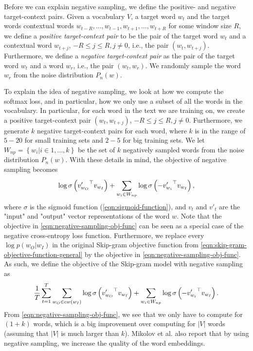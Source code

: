 Before we can explain negative sampling, we define the positive- and negative target-context pairs. Given a vocabulary $V$, a target word $w_t$ and the target words contextual words $w_{t-R}, \ldots, w_{t-1}, w_{t+1}, \ldots, w_{t+R}$ for some window size $R$, we define a \textit{positive target-context pair} to be the pair of the target word $w_t$ and a contextual word $w_{t+j}$, $-R \leq j \leq R, j \neq 0$, i.e., the pair $\left( w_t, w_{t+j} \right)$. Furthermore, we define a \textit{negative target-context pair} as the pair of the target word $w_t$ and a word $w_r$, i.e., the pair $\left( w_t, w_r \right)$. We randomly sample the word $w_r$ from the noise distribution $P_n(w)$.

To explain the idea of negative sampling, we look at how we compute the softmax loss, and in particular, how we only use a subset of all the words in the vocabulary. In particular, for each word in the text we are training on, we create a positive target-context pair $\left( w_t, w_{t+j} \right)$, $-R \leq j \leq R, j \neq 0$. Furthermore, we generate $k$ negative target-context pairs for each word, where $k$ is in the range of $5-20$ for small training sets and $2-5$ for big training sets. We let $W_{np} = \left \{ w_i | i \in 1, \ldots, k \right \}$ be the set of $k$ negatively sampled words from the noise distribution $P_n(w)$. With these details in mind, the objective of negative sampling becomes \cite{mikolov2013b, rong2016word2vec}
\begin{align}
    \log \sigma \left( {v'_{w_O}}^\top v_{w_I} \right) + \sum\limits_{w_i \in W_{np}}^{} \log \sigma \left( -{v'_{w_i}}^\top v_{w_I} \right),
    \label{eqn:negative-sampling-obj-func}
\end{align}
where $\sigma$ is the sigmoid function (\cref{eqn:sigmoid-function}), and $v_t$ and $v'_t$ are the "input" and "output" vector representations of the word $w$. Note that the objective in \cref{eqn:negative-sampling-obj-func} can be seen as a special case of the negative cross-entropy loss function. Furthermore, we replace every $\log p(w_O | w_I)$ in the original Skip-gram objective function from \cref{eqn:skip-gram-objective-function-general} by the objective in \cref{eqn:negative-sampling-obj-func}. As such, we define the objective of the Skip-gram model with negative sampling as
\begin{align}
    \frac{1}{T} \sum\limits_{t=1}^{T} \sum\limits_{w_O \in cw(w_I)}^{} \log \sigma \left( {v'_{w_O}}^\top v_{w_I} \right) + \sum\limits_{w_i \in W_{np}}^{} \log \sigma \left( -{v'_{w_i}}^\top v_{w_I} \right).
    \label{eqn:skip-gram-negative-sampling-objective}
\end{align}
From \cref{eqn:negative-sampling-obj-func}, we see that we only have to compute for $(1 + k)$ words, which is a big improvement over computing for $|V|$ words (assuming that $|V|$ is much larger than $k$). Mikolov et al. also report that by using negative sampling, we increase the quality of the word embeddings.

